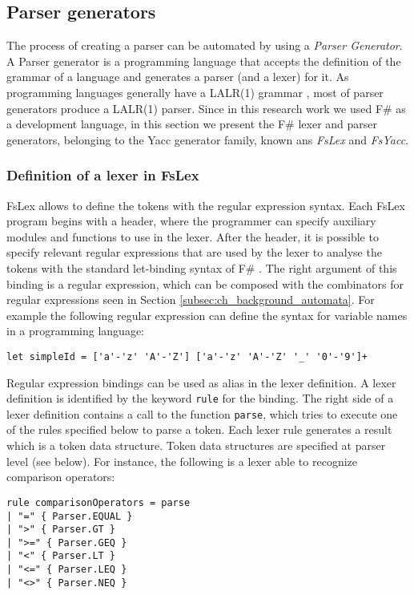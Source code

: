 \subsection{Parser generators}
\label{sec:ch_background_parser_generators}
The process of creating a parser can be automated by using a \textit{Parser Generator}. A Parser generator is a programming language that accepts the definition of the grammar of a language and generates a parser (and a lexer) for it. As programming languages generally have a LALR(1) grammar \cite{appel2002javacompiler}, most of parser generators produce a LALR(1) parser. Since in this research work we used F\# as a development language, in this section we present the F\# lexer and parser generators, belonging to the Yacc generator family, known ans \textit{FsLex} and \textit{FsYacc}.

\subsubsection{Definition of a lexer in FsLex}
FsLex allows to define the tokens with the regular expression syntax. Each FsLex program begins with a header, where the programmer can specify auxiliary modules and functions to use in the lexer. After the header, it is possible to specify relevant regular expressions that are used by the lexer to analyse the tokens with the standard let-binding syntax of F\# \cite{fsharpbinding}. The right argument of this binding is a regular expression, which can be composed with the combinators for regular expressions seen in Section \ref{subsec:ch_background_automata}. For example the following regular expression can define the syntax for variable names in a programming language:

\begin{lstlisting}
let simpleId = ['a'-'z' 'A'-'Z'] ['a'-'z' 'A'-'Z' '_' '0'-'9']+
\end{lstlisting}

Regular expression bindings can be used as alias in the lexer definition. A lexer definition is identified by the keyword \texttt{rule} for the binding. The right side of a lexer definition contains a call to the function \texttt{parse}, which tries to execute one of the rules specified below to parse a token. Each lexer rule generates a result which is a token data structure. Token data structures are specified at parser level (see below). For instance, the following is a lexer able to recognize comparison operators:

\begin{lstlisting}
rule comparisonOperators = parse
| "=" { Parser.EQUAL }
| ">" { Parser.GT }
| ">=" { Parser.GEQ }
| "<" { Parser.LT }
| "<=" { Parser.LEQ }
| "<>" { Parser.NEQ }
\end{lstlisting}

